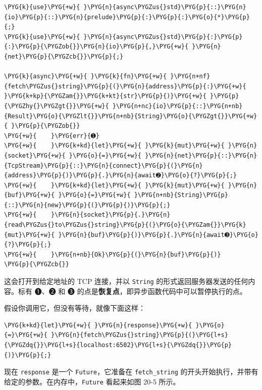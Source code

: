 \begin{Verbatim}[commandchars=\\\{\},breaklines=true,breakanywhere=true,fontsize=\codefont,xleftmargin=17bp]
\PYG{k}{use}\PYG{+w}{ }\PYG{n}{async\PYGZus{}std}\PYG{p}{::}\PYG{n}{io}\PYG{p}{::}\PYG{n}{prelude}\PYG{p}{:}\PYG{p}{:}\PYG{o}{*}\PYG{p}{;}
\PYG{k}{use}\PYG{+w}{ }\PYG{n}{async\PYGZus{}std}\PYG{p}{:}\PYG{p}{:}\PYG{p}{\PYGZob{}}\PYG{n}{io}\PYG{p}{,}\PYG{+w}{ }\PYG{n}{net}\PYG{p}{\PYGZcb{}}\PYG{p}{;}

\PYG{k}{async}\PYG{+w}{ }\PYG{k}{fn}\PYG{+w}{ }\PYG{n+nf}{fetch\PYGZus{}string}\PYG{p}{(}\PYG{n}{address}\PYG{p}{:}\PYG{+w}{ }\PYG{k+kp}{\PYGZam{}}\PYG{k+kt}{str}\PYG{p}{)}\PYG{+w}{ }\PYG{p}{\PYGZhy{}\PYGZgt{}}\PYG{+w}{ }\PYG{n+nc}{io}\PYG{p}{::}\PYG{n+nb}{Result}\PYG{o}{\PYGZlt{}}\PYG{n+nb}{String}\PYG{o}{\PYGZgt{}}\PYG{+w}{ }\PYG{p}{\PYGZob{}}
\PYG{+w}{    }\PYG{err}{➊}
\PYG{+w}{    }\PYG{k+kd}{let}\PYG{+w}{ }\PYG{k}{mut}\PYG{+w}{ }\PYG{n}{socket}\PYG{+w}{ }\PYG{o}{=}\PYG{+w}{ }\PYG{n}{net}\PYG{p}{::}\PYG{n}{TcpStream}\PYG{p}{::}\PYG{n}{connect}\PYG{p}{(}\PYG{n}{address}\PYG{p}{)}\PYG{p}{.}\PYG{n}{await➋}\PYG{o}{?}\PYG{p}{;}
\PYG{+w}{    }\PYG{k+kd}{let}\PYG{+w}{ }\PYG{k}{mut}\PYG{+w}{ }\PYG{n}{buf}\PYG{+w}{ }\PYG{o}{=}\PYG{+w}{ }\PYG{n+nb}{String}\PYG{p}{::}\PYG{n}{new}\PYG{p}{(}\PYG{p}{)}\PYG{p}{;}
\PYG{+w}{    }\PYG{n}{socket}\PYG{p}{.}\PYG{n}{read\PYGZus{}to\PYGZus{}string}\PYG{p}{(}\PYG{o}{\PYGZam{}}\PYG{k}{mut}\PYG{+w}{ }\PYG{n}{buf}\PYG{p}{)}\PYG{p}{.}\PYG{n}{await➌}\PYG{o}{?}\PYG{p}{;}
\PYG{+w}{    }\PYG{n+nb}{Ok}\PYG{p}{(}\PYG{n}{buf}\PYG{p}{)}
\PYG{p}{\PYGZcb{}}
\end{Verbatim}

这会打开到给定地址的 TCP 连接，并以 \texttt{String} 的形式返回服务器发送的任何内容。标有 ➊、➋ 和 ➌ 的点是\textbf{恢复点}，即异步函数代码中可以暂停执行的点。

假设你调用它，但没有等待，就像下面这样：

\begin{Verbatim}[commandchars=\\\{\},breaklines=true,breakanywhere=true,fontsize=\codefont,xleftmargin=17bp]
\PYG{k+kd}{let}\PYG{+w}{ }\PYG{n}{response}\PYG{+w}{ }\PYG{o}{=}\PYG{+w}{ }\PYG{n}{fetch\PYGZus{}string}\PYG{p}{(}\PYG{l+s}{\PYGZdq{}}\PYG{l+s}{localhost:6502}\PYG{l+s}{\PYGZdq{}}\PYG{p}{)}\PYG{p}{;}
\end{Verbatim}

现在 \texttt{response} 是一个 \texttt{Future}，它准备在 \texttt{fetch\_string} 的开头开始执行，并带有给定的参数。在内存中，\texttt{Future} 看起来如图 20-5 所示。

